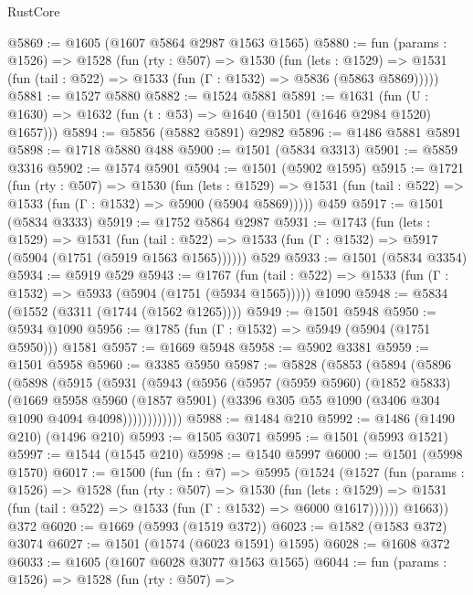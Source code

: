 \begin{lexlean}{RustCore}
\begin{coremodule}
@5869 := @1605 (@1607 @5864 @2987 @1563 @1565)
@5880 := fun (params : @1526) =>
  @1528
    (fun (rty : @507) =>
    @1530
      (fun (lets : @1529) =>
      @1531 (fun (tail : @522) => @1533 (fun (Γ : @1532) => @5836 (@5863 @5869)))))
@5881 := @1527 @5880
@5882 := @1524 @5881
@5891 := @1631 (fun (U : @1630) => @1632 (fun (t : @53) => @1640 (@1501 (@1646 @2984 @1520) @1657)))
@5894 := @5856 (@5882 @5891) @2982
@5896 := @1486 @5881 @5891
@5898 := @1718 @5880 @488
@5900 := @1501 (@5834 @3313)
@5901 := @5859 @3316
@5902 := @1574 @5901
@5904 := @1501 (@5902 @1595)
@5915 := @1721
    (fun (rty : @507) =>
    @1530
      (fun (lets : @1529) =>
      @1531 (fun (tail : @522) => @1533 (fun (Γ : @1532) => @5900 (@5904 @5869)))))
    @459
@5917 := @1501 (@5834 @3333)
@5919 := @1752 @5864 @2987
@5931 := @1743
    (fun (lets : @1529) =>
    @1531
      (fun (tail : @522) => @1533 (fun (Γ : @1532) => @5917 (@5904 (@1751 (@5919 @1563 @1565))))))
    @529
@5933 := @1501 (@5834 @3354)
@5934 := @5919 @529
@5943 := @1767
    (fun (tail : @522) => @1533 (fun (Γ : @1532) => @5933 (@5904 (@1751 (@5934 @1565)))))
    @1090
@5948 := @5834 (@1552 (@3311 (@1744 (@1562 @1265))))
@5949 := @1501 @5948
@5950 := @5934 @1090
@5956 := @1785 (fun (Γ : @1532) => @5949 (@5904 (@1751 @5950))) @1581
@5957 := @1669 @5948
@5958 := @5902 @3381
@5959 := @1501 @5958
@5960 := @3385 @5950
@5987 := @5828
    (@5853
      (@5894
        (@5896
          (@5898
            (@5915
              (@5931
                (@5943
                  (@5956
                    (@5957
                      (@5959 @5960)
                      (@1852 @5833)
                      (@1669
                        @5958
                        @5960
                        (@1857 @5901)
                        (@3396 @305 @55 @1090 (@3406 @304 @1090 @4094 @4098))))))))))))
@5988 := @1484 @210
@5992 := @1486 (@1490 @210) (@1496 @210)
@5993 := @1505 @3071
@5995 := @1501 (@5993 @1521)
@5997 := @1544 (@1545 @210)
@5998 := @1540 @5997
@6000 := @1501 (@5998 @1570)
@6017 := @1500
    (fun (fn : @7) =>
    @5995
      (@1524
        (@1527
          (fun (params : @1526) =>
          @1528
            (fun (rty : @507) =>
            @1530
              (fun (lets : @1529) =>
              @1531 (fun (tail : @522) => @1533 (fun (Γ : @1532) => @6000 @1617))))))
        @1663))
    @372
@6020 := @1669 (@5993 (@1519 @372))
@6023 := @1582 (@1583 @372) @3074
@6027 := @1501 (@1574 (@6023 @1591) @1595)
@6028 := @1608 @372
@6033 := @1605 (@1607 @6028 @3077 @1563 @1565)
@6044 := fun (params : @1526) =>
  @1528
    (fun (rty : @507) =>

\end{coremodule}
\end{lexlean}
